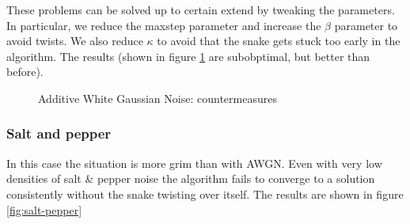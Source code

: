 These problems can be solved up to certain extend by tweaking the parameters. In particular, we reduce the maxstep parameter and increase the $\beta$ parameter to avoid twists. We also reduce $\kappa$ to avoid that the snake gets stuck too early in the algorithm. The results (shown in figure  \ref{fig:awgn-countermeasures} are subobptimal, but better than before).

\begin{figure}[!hbt]
\centering   
{}

\caption{Additive White Gaussian Noise: countermeasures}
\label{fig:awgn-countermeasures}
\end{figure}

\subsubsection{Salt and pepper}

In this case the situation is more grim than with AWGN. Even with very low densities of salt \& pepper noise the algorithm fails to converge to a solution consistently without the snake twisting over itself. The results are shown in figure \ref{fig:salt-pepper}

